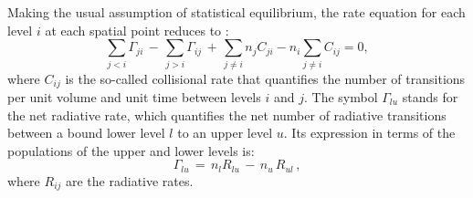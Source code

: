 \documentclass[12pt]{article}
\begin{document}
Making the usual assumption of statistical equilibrium, the rate equation for each
level $i$ at each spatial point reduces to \citep[e.g.,][]{socas_trujillo97}:
\begin{equation}
\label{eq:statis_equil_eq}
\sum_{j < i}{\Gamma}_{ji}\,-\,\sum_{j > i}{\Gamma}_{ij}\,
+\,\sum_{j \neq i}{n_j C_{ji}} - n_i \sum_{j \neq i}{C_{ij}} = 0,
\end{equation}
where $C_{ij}$ is the so-called collisional rate that quantifies the number of
transitions per unit volume and unit time between levels $i$ and $j$. The symbol
$\Gamma_{lu}$ stands for the net radiative rate, which quantifies the net number of
radiative transitions between a bound lower level $l$ to an upper level $u$. Its
expression in terms of the populations of the upper and lower levels is:
\begin{equation}
\label{eq:net_rad_rate}
\Gamma_{lu}\,=\,n_l R_{lu}\,-\,n_u\,R_{ul}\, ,
\end{equation}
where $R_{ij}$ are the radiative rates.
\end{document}
